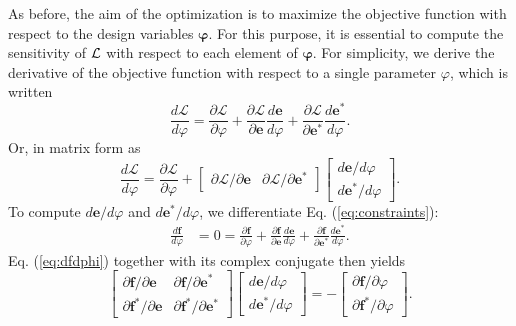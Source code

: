 As before, the aim of the optimization is to maximize the objective function with respect to the design variables $\bm{\varphi}$. For this purpose, it is essential to compute the sensitivity of $\mathcal{L}$ with respect to each element of $\bm{\varphi}$.  For simplicity, we derive the derivative of the objective function with respect to a single parameter $\varphi$, which is written
%
\begin{equation}
\frac{d\mathcal{L}}{d\varphi} = \frac{\partial\mathcal{L}}{\partial\varphi} + \frac{\partial\mathcal{L}}{\partial\mathbf{e}}\frac{d\mathbf{e}}{d\varphi} + \frac{\partial\mathcal{L}}{\partial\mathbf{e}^*}\frac{d\mathbf{e}^*}{d\varphi}.
\end{equation}
%
Or, in matrix form as
\begin{equation}
\frac{d\mathcal{L}}{d\varphi} = \frac{\partial\mathcal{L}}{\partial\varphi} + 
\begin{bmatrix}
\partial\mathcal{L} / \partial\mathbf{e} &
\partial\mathcal{L} / \partial\mathbf{e}^*
\end{bmatrix}
\begin{bmatrix}
d\mathbf{e} / d\varphi \\ d\mathbf{e}^* / d\varphi
\end{bmatrix}.
\label{eq:dLdphi_matrix}
\end{equation}
To compute $d\mathbf{e}/d\varphi$ and $d\mathbf{e}^*/d\varphi$, we differentiate Eq. (\ref{eq:constraints}):
%
\begin{align}
\frac{d\mathbf{f}}{d\varphi} &= 0 = \frac{\partial \mathbf{f}}{\partial \varphi} + \frac{\partial \mathbf{f}}{\partial \mathbf{e}}\frac{d \mathbf{e}}{d\varphi} + \frac{\partial \mathbf{f}}{\partial \mathbf{e}^*}\frac{d \mathbf{e}^*}{d\varphi}. \label{eq:dfdphi}
\end{align}
%
Eq. (\ref{eq:dfdphi}) together with its complex conjugate then yields
%
\begin{equation}
\begin{bmatrix}
\partial \mathbf{f} / \partial \mathbf{e} &
\partial \mathbf{f} / \partial \mathbf{e}^* \\
\partial \mathbf{f}^* / \partial \mathbf{e} &
\partial \mathbf{f}^* / \partial \mathbf{e}^*
\end{bmatrix}
\begin{bmatrix}
d\mathbf{e} / d\varphi \\ d\mathbf{e}^* / d\varphi
\end{bmatrix} = -\begin{bmatrix}
\partial \mathbf{f} / \partial \varphi \\ \partial \mathbf{f}^* / \partial \varphi
\end{bmatrix}.
\end{equation}
